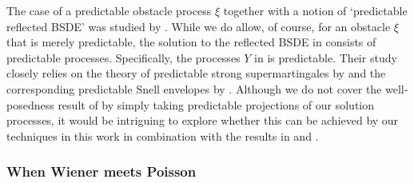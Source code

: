\documentclass[10pt]{article} %
\newcommand{\1}{\mathbf{1}}
\begin{document}
The case of a predictable obstacle process $\xi$ together with a notion of `predictable reflected BSDE' was studied by \citeauthor*{bouhadou2018non} \cite{bouhadou2018non}. While we do allow, of course, for an obstacle $\xi$ that is merely predictable, the solution to the reflected BSDE in \cite{bouhadou2018non} consists of predictable processes. Specifically, the processes $Y$ in \cite{bouhadou2018non} is predictable. Their study closely relies on the theory of predictable strong supermartingales by \citeauthor*{meyer1976cours} \cite[page 388]{meyer1976cours} and the corresponding predictable Snell envelopes by \citeauthor*{karoui1978arret} \cite{karoui1978arret}. Although we do not cover the well-posedness result of \cite{bouhadou2018non} by simply taking predictable projections of our solution processes, it would be intriguing to explore whether this can be achieved by our techniques in this work in combination with the results in \cite{karoui1978arret} and \cite{meyer1976cours}.

\subsubsection{When Wiener meets Poisson}
\end{document}
